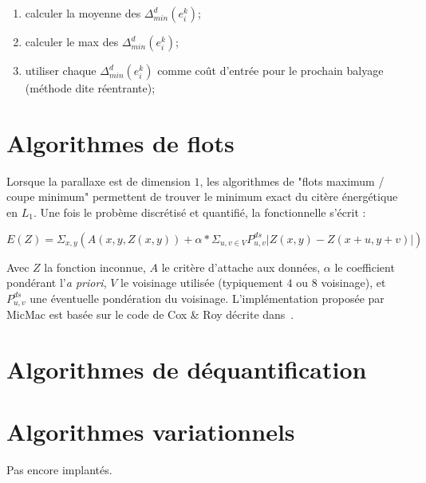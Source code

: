 \begin{enumerate}
   \item calculer la moyenne des $\Delta^d_{min}(e^k_i)$;
   \item calculer le max des $\Delta^d_{min}(e^k_i)$;
   \item utiliser chaque $\Delta^d_{min}(e^k_i)$ comme co\^ut d'entr\'ee
         pour le prochain balyage (m\'ethode dite r\'eentrante);
\end{enumerate}





\section{Algorithmes de flots}

Lorsque la parallaxe est de dimension $1$,
les algorithmes de "flots maximum / coupe minimum" permettent
de trouver le minimum exact du cit\`ere \'energ\'etique
en $L_1$. Une fois le prob\`eme discr\'etis\'e et quantifi\'e, 
la fonctionnelle s'\'ecrit :


\begin{equation}
  \label{CostGrad:MaxFlot}
  E(Z) = \Sigma _{x,y}  (A(x,y,Z(x,y)) + \alpha *  \Sigma _{u,v \in V}P^{ds}_{u,v}|Z(x,y)-Z(x+u,y+v)|)
\end{equation}

Avec $Z$ la fonction inconnue, $A$ le crit\`ere d'attache aux donn\'ees, 
$\alpha$ le coefficient pond\'erant l'\emph{a priori}, $V$ le voisinage
utilis\'ee (typiquement $4$ ou $8$ voisinage), et $P^{ds}_{u,v}$ une
\'eventuelle pond\'eration du voisinage.
L'impl\'ementation propos\'ee par MicMac est bas\'ee sur le code
de Cox \& Roy d\'ecrite dans~\cite{CoxRoy}.





\section{Algorithmes de d\'equantification}

\label{DUMG:DEQUANTIF}



\section{Algorithmes variationnels}

Pas encore implant\'es.



